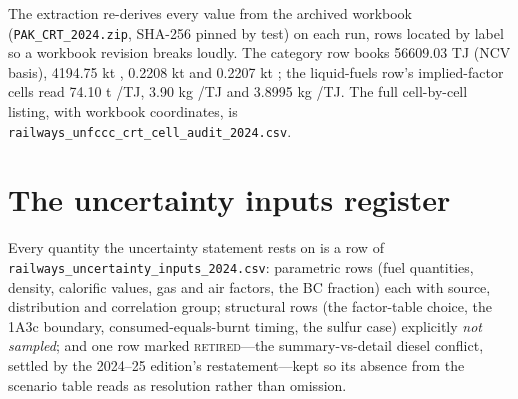 \documentclass[5p,times,authoryear]{elsarticle}
\begin{document}
The extraction re-derives every value from the archived workbook
(\texttt{PAK\_CRT\_2024.zip}, SHA-256 pinned by test) on each run, rows located by label
so a workbook revision breaks loudly. The category row books \num{56609.03} TJ (NCV
basis), \num{4194.75} kt \COtwo{}, \num{0.2208} kt \CHfour{} and \num{0.2207} kt
\NtwoO{}; the liquid-fuels row's implied-factor cells read \num{74.10} t \COtwo{}/TJ,
\num{3.90} kg \CHfour{}/TJ and \num{3.8995} kg \NtwoO{}/TJ. The full cell-by-cell listing,
with workbook coordinates, is \texttt{railways\_unfccc\_crt\_cell\_audit\_2024.csv}.

\section{The uncertainty inputs register}

Every quantity the uncertainty statement rests on is a row of
\texttt{railways\_uncertainty\_inputs\_2024.csv}: parametric rows (fuel quantities,
density, calorific values, gas and air factors, the BC fraction) each with source,
distribution and correlation group; structural rows (the factor-table choice, the 1A3c
boundary, consumed-equals-burnt timing, the sulfur case) explicitly \emph{not sampled};
and one row marked \textsc{retired}---the summary-vs-detail diesel conflict, settled by
the 2024--25 edition's restatement---kept so its absence from the scenario table reads as
resolution rather than omission.
\end{document}
